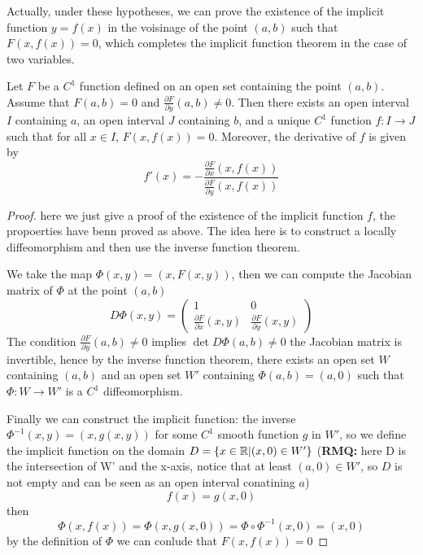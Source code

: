 \documentclass[12pt,a4paper]{article}
\begin{document}
Actually, under these hypotheses, we can prove the existence of the implicit function \(y= f(x)\) in the voisinage of the point \((a,b)\) such that \(F(x,f(x))=0\), which completes the implicit function theorem in the case of two variables.\\

\begin{theorem}
Let \(F\) be a \(C^1\) function defined on an open set containing the point \((a,b)\). Assume that \(F(a,b) = 0\) and \(\frac{\partial F}{\partial y}(a,b) \neq 0\). Then there exists an open interval \(I\) containing \(a\), an open interval \(J\) containing \(b\), and a unique \(C^1\) function \(f: I \to J\) such that for all \(x \in I\), \(F(x, f(x)) = 0\). Moreover, the derivative of \(f\) is given by
\[f'(x) = -\frac{\frac{\partial F}{\partial x}(x,f(x))}{\frac{\partial F}{\partial y}(x,f(x))}\]
\end{theorem}

\begin{proof}
    here we just give a proof of the existence of the implicit function \(f\), the propoerties have benn proved as above. The idea here is to construct a locally diffeomorphism and then use the inverse function theorem.

    We take the map \(\Phi(x,y) = (x, F(x,y))\), then we can compute the Jacobian matrix of \(\Phi\) at the point \((a,b)\)
    \[D\Phi(x,y) = \begin{pmatrix}
        1 & 0 \\
        \frac{\partial F}{\partial x}(x,y) & \frac{\partial F}{\partial y}(x,y) 
\end{pmatrix}\]
The condition \(\frac{\partial F}{\partial y}(a,b) \neq 0\) implies \(\det D\Phi(a,b) \neq 0\) the Jacobian matrix is invertible, hence by the inverse function theorem, there exists an open set \(W\) containing \((a,b)\) and an open set \(W'\) containing \(\Phi(a,b) = (a,0)\) such that \(\Phi: W \to W'\) is a \(C^1\) diffeomorphism.

Finally we can construct the implicit function: the inverse \(\Phi^{-1}(x,y) = (x, g(x,y))\) for some \(C^1\) smooth function \(g\) in \(W'\), so we define the implicit function on the domain \(D = \{x \in \mathbb{R} | (x,0) \in W'\}\) (\textbf{RMQ:} here D is the intersection of W' and the x-axis, notice that at least \((a,0) \in W'\), so \(D\) is not empty and can be seen as an open interval conatining \(a\))
\[f(x) = g(x,0)\]
then 
\[\Phi(x,f(x)) = \Phi(x,g(x,0)) = \Phi \circ \Phi^{-1}(x,0) = (x,0)\]
by the definition of \(\Phi\) we can conlude that \(F(x,f(x)) = 0\)
\end{proof}
\end{document}
